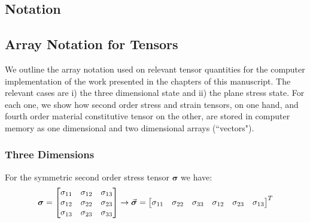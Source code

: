 \begin{appendices}



\chapter{Notation}\label{appendix:0}

\section*{Array Notation for Tensors}

We outline the array notation used on relevant tensor quantities for the 
computer implementation of the work presented in the chapters of this 
manuscript. The relevant cases are i) the three dimensional state and ii) the 
plane stress state. For each one, we show how second order stress and strain 
tensors, on one hand, and fourth order material constitutive tensor on the 
other, are stored in computer memory as one dimensional and two dimensional 
arrays (``vectors").

\subsection*{Three Dimensions}

For the symmetric second order stress tensor $\bm{\sigma}$ we have:
\begin{equation*}
	\boldsymbol{\sigma} = \begin{bmatrix}
		\sigma_{11} & \sigma_{12} & \sigma_{13} \\
		\sigma_{12} & \sigma_{22} & \sigma_{23} \\
		\sigma_{13} & \sigma_{23} & \sigma_{33} \\
	\end{bmatrix}\rightarrow \vec{\bm{\sigma}} = \begin{bmatrix}
		\sigma_{11} & \sigma_{22} & \sigma_{33} & \sigma_{12} & \sigma_{23} & 
		\sigma_{13}
	\end{bmatrix}^T
\end{equation*}


\end{appendices}
